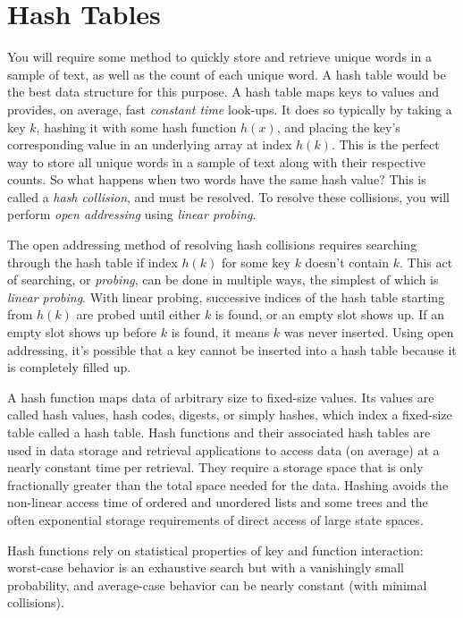 \section{Hash Tables}\label{sec:hashtable}

You will require some method to quickly store and retrieve unique words in a
sample of text, as well as the count of each unique word. A hash table would be
the best data structure for this purpose. A hash table maps keys to values and
provides, on average, fast \emph{constant time} look-ups. It does so typically
by taking a key $k$, hashing it with some hash function $h(x)$, and placing the
key's corresponding value in an underlying array at index $h(k)$. This is the
perfect way to store all unique words in a sample of text along with their
respective counts. So what happens when two words have the same hash value? This
is called a \emph{hash collision}, and must be resolved. To resolve these
collisions, you will perform \emph{open addressing} using \emph{linear probing}.

The open addressing method of resolving hash collisions requires searching
through the hash table if index $h(k)$ for some key $k$ doesn't contain $k$.
This act of searching, or \emph{probing}, can be done in multiple ways, the
simplest of which is \emph{linear probing}. With linear probing, successive
indices of the hash table starting from $h(k)$ are probed until either $k$ is
found, or an empty slot shows up. If an empty slot shows up before $k$ is found,
it means $k$ was never inserted. Using open addressing, it's possible that a key
cannot be inserted into a hash table because it is completely filled up.

A hash function maps data of arbitrary size to fixed-size values. Its values are
called hash values, hash codes, digests, or simply hashes, which index a
fixed-size table called a hash table.  Hash functions and their associated hash
tables are used in data storage and retrieval applications to access data (on
average) at a nearly constant time per retrieval. They require a storage space
that is only fractionally greater than the total space needed for the data.
Hashing avoids the non-linear access time of ordered and unordered lists and
some trees and the often exponential storage requirements of direct access of
large state spaces.

Hash functions rely on statistical properties of key and function interaction:
worst-case behavior is an exhaustive search but with a vanishingly small
probability, and average-case behavior can be nearly constant (with minimal
collisions).

